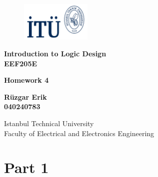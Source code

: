 \documentclass[table,draft ]{article}
\def\mytitle{Homework 4}
\begin{document}
\begin{titlepage}
    \begin{figure}[h] %
        \begin{flushright}
        \includegraphics[width=0.3\textwidth]{logo_laci.png} %
            
        \end{flushright}
        \hfill
    \end{figure}

    \centering
    \vspace*{1in}
    
    \Huge
    \textbf{Introduction to Logic Design} \\
    \textbf{EEF205E} \\

    \vspace{0.5in}

    \Large
    \textbf{\mytitle} \\
    
    \vspace{0.5in}

    \large
    \textbf{Rüzgar Erik} \\
    \textbf{040240783} \\

    \vspace{0.5in}
    
    \Large
    Istanbul Technical University \\
    Faculty of Electrical and Electronics Engineering \\
    
    \vfill


\end{titlepage}



\section*{Part 1}
\end{document}
